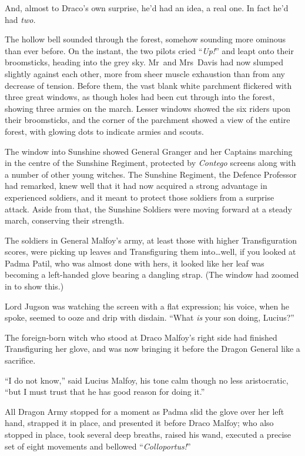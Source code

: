 And, almost to Draco’s own surprise, he’d had an idea, a real one. In fact he’d
had \emph{two.}

The hollow bell sounded through the forest, somehow sounding more ominous than
ever before. On the instant, the two pilots cried “\emph{Up!}” and leapt onto
their broomsticks, heading into the grey sky.
\later
Mr~and Mrs~Davis had now slumped slightly against each other, more from sheer
muscle exhaustion than from any decrease of tension. Before them, the vast
blank white parchment flickered with three great windows, as though holes had
been cut through into the forest, showing three armies on the march. Lesser
windows showed the six riders upon their broomsticks, and the corner of the
parchment showed a view of the entire forest, with glowing dots to indicate
armies and scouts.

The window into Sunshine showed General Granger and her Captains marching in
the centre of the Sunshine Regiment, protected by \emph{Contego} screens along
with a number of other young witches. The Sunshine Regiment, the Defence
Professor had remarked, knew well that it had now acquired a strong advantage
in experienced soldiers, and it meant to protect those soldiers from a surprise
attack. Aside from that, the Sunshine Soldiers were moving forward at a steady
march, conserving their strength.

The soldiers in General Malfoy’s army, at least those with higher
Transfiguration scores, were picking up leaves and Transfiguring them
into…well, if you looked at Padma Patil, who was almost done with hers,
it looked like her leaf was becoming a left-handed glove bearing a dangling
strap. (The window had zoomed in to show this.)

Lord Jugson was watching the screen with a flat expression; his voice, when he
spoke, seemed to ooze and drip with disdain. “What \emph{is} your son doing,
Lucius?”

The foreign-born witch who stood at Draco Malfoy’s right side had finished
Transfiguring her glove, and was now bringing it before the Dragon General like
a sacrifice.

“I do not know,” said Lucius Malfoy, his tone calm though no less aristocratic,
“but I must trust that he has good reason for doing it.”

All Dragon Army stopped for a moment as Padma slid the glove over her left
hand, strapped it in place, and presented it before Draco Malfoy; who also
stopped in place, took several deep breaths, raised his wand, executed a
precise set of eight movements and bellowed “\emph{Colloportus!}”

